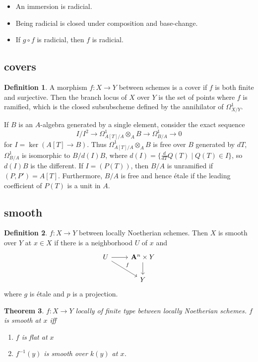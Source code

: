 \documentclass[leqno]{amsart}
\newcommand{\A}{\mathbf A}
\newcommand{\1}{\mathbf{1}}
\newtheorem{thm}{Theorem}[section]
\theoremstyle{definition}
\newtheorem{defn}[thm]{Definition}
\theoremstyle{remark}
\begin{document}
\begin{itemize}
	\item An immersion is radicial.
	\item Being radicial is closed under composition
		and base-change.
	\item If $g\circ f$ is radicial, then $f$ is radicial.
\end{itemize}

\subsection{covers}
\begin{defn}
	A morphism $f\colon X\to Y$ between schemes
	is a cover if $f$ is both finite and surjective.
	Then the branch locus of $X$ over  $Y$
	is the set of points where $f$ is ramified,
	which is the closed subsubscheme
	defined by the annihilator of $\Omega^1_{X/Y}$.
\end{defn}

If $B$ is an  $A$-algebra generated by a single element,
consider the exact sequence
\[
	 I/I^2\to \Omega^1_{A[T]/A}\otimes_AB
	 \to \Omega^1_{B/A}\to 0
\]
for $I=\ker(A[T]\to B)$.
Thus $\Omega^1_{A[T]/A}\otimes_AB$ 
is free over $B$ generated by $dT$,
$\Omega^1_{B/A}$ is isomorphic to $B/d(I)B$,
where $d(I)=\{\frac{d}{dT}Q(T)\mid Q(T)\in I\}$,
so $d(I)B$ is the different.
If $I=(P(T))$, then
$B/A$ is unramified if $(P,P')=A[T]$.
Furthermore, $B/A$ is free and hence \'{e}tale
if the leading coefficient of $P(T)$ is a unit in $A$.

\subsection{smooth}

\begin{defn}
	$f\colon X\to Y$
	between locally Noetherian schemes.
	Then  $X$ is smooth over  $Y$
	at  $x\in X$ if there is a neighborhood
	 $U$ of  $x$ and
	  \[
	 	\begin{tikzcd}
			U\arrow[r]\arrow[dr,"f"]
			& \A^n\times Y\arrow[d]\\
			& Y
	 	\end{tikzcd}
	 \]
	 where $g$ is \'{e}tale and  $p$ is 
	 a projection.
\end{defn}

\begin{thm}
	$f\colon X\to Y$
	locally of finite type
	between locally Noetherian schemes.
	 $f$ is smooth at  $x$ iff
	  \begin{enumerate}[label=(\alph*)]
	 	\item $f$ is flat at  $x$
		\item $f^{-1}(y)$
			is smooth over  $k(y)$
			at  $x$.
	 \end{enumerate}
\end{thm}
\end{document}
